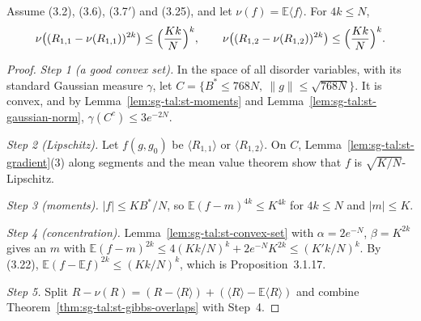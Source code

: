 \begin{theorem}\label{thm:sg-tal:st-overlaps}
  \leanok
Assume (3.2), (3.6), (3.7$'$) and (3.25), and let $\nu(f)=\mathbb E\langle f\rangle$. For $4k\le N$,
\[
\nu\bigl((R_{1,1}-\nu(R_{1,1}))^{2k}\bigr)\le\Bigl(\frac{Kk}N\Bigr)^k,\qquad
\nu\bigl((R_{1,2}-\nu(R_{1,2}))^{2k}\bigr)\le\Bigl(\frac{Kk}N\Bigr)^k.
\]
\end{theorem}
\begin{proof}
  \leanok
\emph{Step 1 (a good convex set).} In the space of all disorder variables, with its standard Gaussian
measure $\gamma$, let $C=\{B^*\le768N,\ \|g\|\le\sqrt{768N}\}$. It is convex, and by
Lemma~\ref{lem:sg-tal:st-moments} and Lemma~\ref{lem:sg-tal:st-gaussian-norm},
$\gamma(C^c)\le3e^{-2N}$.

\emph{Step 2 (Lipschitz).} Let $f(g,g_0)$ be $\langle R_{1,1}\rangle$ or $\langle R_{1,2}\rangle$. On $C$,
Lemma~\ref{lem:sg-tal:st-gradient}(3) along segments and the mean value theorem show that $f$ is
$\sqrt{K/N}$-Lipschitz.

\emph{Step 3 (moments).} $|f|\le KB^*/N$, so $\mathbb E(f-m)^{4k}\le K^{4k}$ for $4k\le N$ and $|m|\le K$.

\emph{Step 4 (concentration).} Lemma~\ref{lem:sg-tal:st-convex-set} with $\alpha=2e^{-N}$, $\beta=K^{2k}$ gives
an $m$ with $\mathbb E(f-m)^{2k}\le4(Kk/N)^k+2e^{-N}K^{2k}\le(K'k/N)^k$. By (3.22),
$\mathbb E(f-\mathbb Ef)^{2k}\le(Kk/N)^k$, which is Proposition~3.1.17.

\emph{Step 5.} Split $R-\nu(R)=(R-\langle R\rangle)+(\langle R\rangle-\mathbb E\langle R\rangle)$ and combine
Theorem~\ref{thm:sg-tal:st-gibbs-overlaps} with Step~4.
\end{proof}

